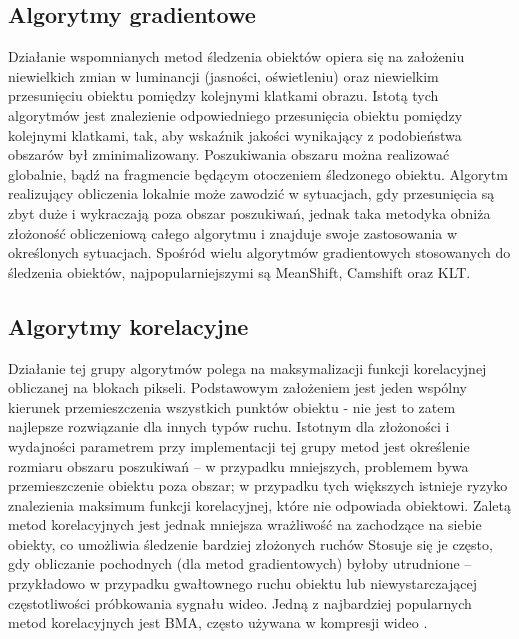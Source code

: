 \subsection{Algorytmy gradientowe}

Działanie wspomnianych metod śledzenia obiektów opiera się na założeniu niewielkich zmian w luminancji (jasności, oświetleniu) oraz niewielkim przesunięciu obiektu pomiędzy kolejnymi klatkami obrazu. %
Istotą tych algorytmów jest znalezienie odpowiedniego przesunięcia obiektu pomiędzy kolejnymi klatkami, tak, aby wskaźnik jakości wynikający z podobieństwa obszarów był zminimalizowany. 
Poszukiwania obszaru można realizować globalnie, bądź na fragmencie będącym otoczeniem śledzonego obiektu. 
Algorytm realizujący obliczenia lokalnie może zawodzić w sytuacjach, gdy przesunięcia są zbyt duże i wykraczają poza obszar poszukiwań, jednak taka metodyka obniża złożoność obliczeniową całego algorytmu i znajduje swoje zastosowania w określonych sytuacjach. %
Spośród wielu algorytmów gradientowych stosowanych do śledzenia obiektów, najpopularniejszymi są MeanShift, Camshift oraz KLT. %

\subsection{Algorytmy korelacyjne}

Działanie tej grupy algorytmów polega na maksymalizacji funkcji korelacyjnej obliczanej na blokach pikseli. %
Podstawowym założeniem jest jeden wspólny kierunek przemieszczenia wszystkich punktów obiektu - nie jest to zatem najlepsze rozwiązanie dla innych typów ruchu. %
Istotnym dla złożoności i wydajności parametrem przy implementacji tej grupy metod jest określenie rozmiaru obszaru poszukiwań -- w przypadku mniejszych, problemem bywa przemieszczenie obiektu poza obszar; w przypadku tych większych istnieje ryzyko znalezienia maksimum funkcji korelacyjnej, które nie odpowiada obiektowi. %
Zaletą metod korelacyjnych jest jednak mniejsza wrażliwość na zachodzące na siebie obiekty, co umożliwia śledzenie bardziej złożonych ruchów %
Stosuje się je często, gdy obliczanie pochodnych (dla metod gradientowych) byłoby utrudnione -- przykładowo w przypadku gwałtownego ruchu obiektu lub niewystarczającej częstotliwości próbkowania sygnału wideo. %
Jedną z najbardziej popularnych metod korelacyjnych jest BMA, często używana w kompresji wideo \cite{Aroh}.

